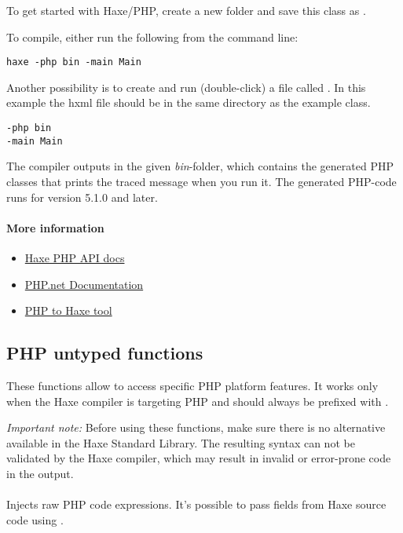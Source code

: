 To get started with Haxe/PHP, create a new folder and save this class as .


To compile, either run the following from the command line:

\begin{lstlisting}
haxe -php bin -main Main
\end{lstlisting}

Another possibility is to create and run (double-click) a file called . In this example the hxml file should be in the same directory as the example class.

\begin{lstlisting}
-php bin
-main Main
\end{lstlisting}

The compiler outputs in the given \emph{bin}-folder, which contains the generated PHP classes that prints the traced message when you run it. The generated PHP-code runs for version 5.1.0 and later.

\paragraph{More information}

\begin{itemize}
	\item \href{http://api.haxe.org/php/}{Haxe PHP API docs}
	\item \href{http://php.net/docs.php}{PHP.net Documentation}
	\item \href{http://phptohaxe.haqteam.com/code.php}{PHP to Haxe tool}
\end{itemize}


\subsection{PHP untyped functions}
\label{target-php-untyped}

These functions allow to access specific PHP platform features. It works only when the Haxe compiler is targeting PHP and should always be prefixed with . 

\emph{Important note:} Before using these functions, make sure there is no alternative available in the Haxe Standard Library. The resulting syntax can not be validated by the Haxe compiler, which may result in invalid or error-prone code in the output.

\paragraph{}
Injects raw PHP code expressions. It's possible to pass fields from Haxe source code using .

